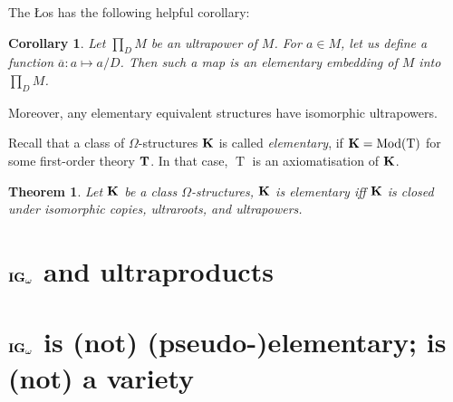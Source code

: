 \documentclass[a4paper]{article}
\theoremstyle{defin}
\theoremstyle{theorem}
\newtheorem{theorem}{Theorem}
\theoremstyle{prop}
\theoremstyle{lemma}
\theoremstyle{fact}
\theoremstyle{ex}
\theoremstyle{col}
\newtheorem{col}{Corollary}
\begin{document}
The \L{}os has the following helpful corollary:

\begin{col}
  Let $\prod \limits_{D} M$ be an ultrapower of $M$. For $a \in M$, let us define a function $\overline{a} : a \mapsto a / D$.
  Then such a map is an elementary embedding of $M$ into $\prod \limits_{D} M$.
\end{col}

Moreover, any elementary equivalent structures have isomorphic ultrapowers.

Recall that a class of $\Omega$-structures ${\bf K}$ is called \emph{elementary}, if ${\bf K} = \operatorname{Mod}(\operatorname{T})$ for some first-order theory ${\bf T}$. In that case, $\operatorname{T}$ is an axiomatisation of ${\bf K}$.

\begin{theorem}
  Let ${\bf K}$ be a class $\Omega$-structures,
  ${\bf K}$ is elementary iff ${\bf K}$ is closed under isomorphic copies, ultraroots, and ultrapowers.
\end{theorem}


\section{${\bf IG}_{\omega}$ and ultraproducts}

\section{${\bf IG}_{\omega}$ is (not) (pseudo-)elementary; is (not) a variety}



\end{document}
